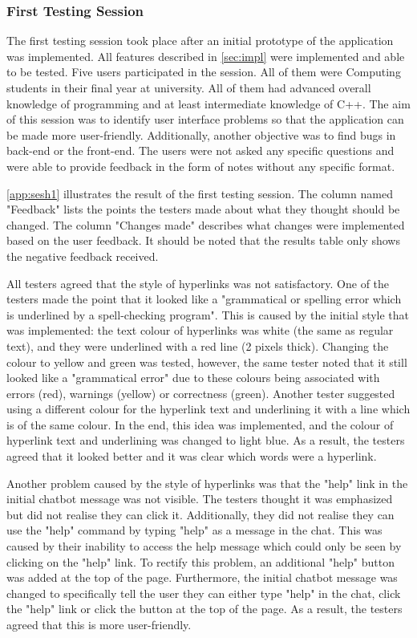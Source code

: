 \documentclass[12pt,a4paper]{article}
\begin{document}
\subsubsection{First Testing Session}
The first testing session took place after an initial prototype of the application was implemented. All features described in \cref{sec:impl} were implemented and able to be tested. Five users participated in the session. All of them were Computing students in their final year at university. All of them had advanced overall knowledge of programming and at least intermediate knowledge of C++. The aim of this session was to identify user interface problems so that the application can be made more user-friendly. Additionally, another objective was to find bugs in back-end or the front-end. The users were not asked any specific questions and were able to provide feedback in the form of notes without any specific format.

\cref{app:sesh1} illustrates the result of the first testing session. The column named "Feedback" lists the points the testers made about what they thought should be changed. The column "Changes made" describes what changes were implemented based on the user feedback. It should be noted that the results table only shows the negative feedback received.

All testers agreed that the style of hyperlinks was not satisfactory. One of the testers made the point that it looked like a "grammatical or spelling error which is underlined by a spell-checking program". This is caused by the initial style that was implemented: the text colour of hyperlinks was white (the same as regular text), and they were underlined with a red line (2 pixels thick). Changing the colour to yellow and green was tested, however, the same tester noted that it still looked like a "grammatical error" due to these colours being associated with errors (red), warnings (yellow) or correctness (green). Another tester suggested using a different colour for the hyperlink text and underlining it with a line which is of the same colour. In the end, this idea was implemented, and the colour of hyperlink text and underlining was changed to light blue. As a result, the testers agreed that it looked better and it was clear which words were a hyperlink. 

Another problem caused by the style of hyperlinks was that the "help" link in the initial chatbot message was not visible. The testers thought it was emphasized but did not realise they can click it. Additionally, they did not realise they can use the "help" command by typing "help" as a message in the chat. This was caused by their inability to access the help message which could only be seen by clicking on the "help" link. To rectify this problem, an additional "help" button was added at the top of the page. Furthermore, the initial chatbot message was changed to specifically tell the user they can either type "help" in the chat, click the "help" link or click the button at the top of the page. As a result, the testers agreed that this is more user-friendly.
\end{document}
